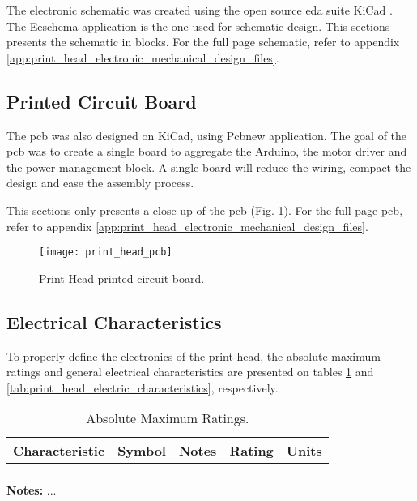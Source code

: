 The electronic schematic was created using the open source \gls{eda} suite KiCad \cite{KiCad_webpage}. The Eeschema application is the one used for schematic design. This sections presents the schematic in blocks. For the full page schematic, refer to appendix \ref{app:print_head_electronic_mechanical_design_files}.


\subsection{Printed Circuit Board}
\label{subsec:bioprinting_system_electronics_design_pcb}

The \gls{pcb} was also designed on KiCad, using Pcbnew application. The goal of the \gls{pcb} was to create a single board to aggregate the Arduino, the motor driver and the power management block. A single board will reduce the wiring, compact the design and ease the assembly process.

This sections only presents a close up of the \gls{pcb} (Fig. \ref{fig:print_head_pcb}). For the full page \gls{pcb}, refer to appendix \ref{app:print_head_electronic_mechanical_design_files}.

\begin{figure}[htbp]
	\centering
	\texttt{[image: print\_head\_pcb]}
	\caption{Print Head printed circuit board.}
	\label{fig:print_head_pcb}
\end{figure}


\subsection{Electrical Characteristics}
\label{subsec:bioprinting_system_electronics_characteristics}

To properly define the electronics of the print head, the absolute maximum ratings and general electrical characteristics are presented on tables  \ref{tab:print_head_max_ratings} and \ref{tab:print_head_electric_characteristics}, respectively.

\begin{table}[htbp]
    \caption{Absolute Maximum Ratings.}
    \centering
    \begin{threeparttable}
        \begin{tabular}{l|c|c|c|c}
        \toprule
             \textbf{Characteristic} & \textbf{Symbol} & \textbf{Notes} & \textbf{Rating} & \textbf{Units} \\
        \midrule
             & & & & \\
        \bottomrule
        \end{tabular}
        \begin{tablenotes}
            \small
            \item \textbf{Notes:} ...
        \end{tablenotes}
    \end{threeparttable}
    \label{tab:print_head_max_ratings}
\end{table}


